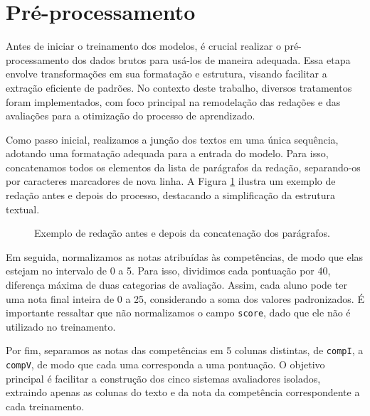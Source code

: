 
\section{Pré-processamento}
\label{sec:preprocessing}

Antes de iniciar o treinamento dos modelos, é crucial realizar o pré-processamento dos dados brutos para usá-los de maneira adequada. Essa etapa envolve transformações em sua formatação e estrutura, visando facilitar a extração eficiente de padrões. No contexto deste trabalho, diversos tratamentos foram implementados, com foco principal na remodelação das redações e das avaliações para a otimização do processo de aprendizado.

Como passo inicial, realizamos a junção dos textos em uma única sequência, adotando uma formatação adequada para a entrada do modelo. Para isso, concatenamos todos os elementos da lista de parágrafos da redação, separando-os por caracteres marcadores de nova linha. A Figura \ref{fig:preprocessing-1} ilustra um exemplo de redação antes e depois do processo, destacando a simplificação da estrutura textual.

\begin{figure}[H]
    \caption{Exemplo de redação antes e depois da concatenação dos parágrafos.}
    \label{fig:preprocessing-1}
    \centering
    \resizebox{0.9\textwidth}{!}{}
\end{figure}

Em seguida, normalizamos as notas atribuídas às competências, de modo que elas estejam no intervalo de 0 a 5. Para isso, dividimos cada pontuação por 40, diferença máxima de duas categorias de avaliação. Assim, cada aluno pode ter uma nota final inteira de 0 a 25, considerando a soma dos valores padronizados. É importante ressaltar que não normalizamos o campo \texttt{score}, dado que ele não é utilizado no treinamento.

Por fim, separamos as notas das competências em 5 colunas distintas, de \texttt{compI}, a \texttt{compV}, de modo que cada uma corresponda a uma pontuação. O objetivo principal é facilitar a construção dos cinco sistemas avaliadores isolados, extraindo apenas as colunas do texto e da nota da competência correspondente a cada treinamento.

